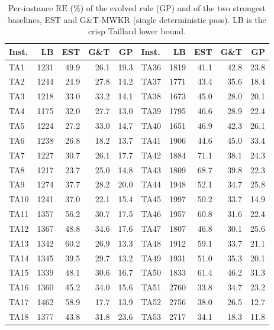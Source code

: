 \documentclass[review,authoryear,11pt]{elsarticle}
\newcommand{\RE}{\mathrm{RE}}
\begin{document}
\begin{table}[t]
\centering\scriptsize
\caption{Per-instance $\RE$ (\%) of the evolved rule (GP) and of the two
strongest baselines, EST and G\&T-MWKR (single deterministic pass). LB is
the crisp Taillard lower bound.}
\label{tab:perinstance}
\renewcommand{\arraystretch}{0.92}
\setlength{\tabcolsep}{4pt}
\begin{tabular}{lrrrr@{\hskip 0.9em}|@{\hskip 0.9em}lrrrr}
\toprule
Inst. & LB & EST & G\&T & GP & Inst. & LB & EST & G\&T & GP \\
\midrule
TA1 & 1231 & 49.9 & 26.1 & 19.3 & TA36 & 1819 & 41.1 & 42.8 & 23.8 \\
TA2 & 1244 & 24.9 & 27.8 & 14.2 & TA37 & 1771 & 43.4 & 35.6 & 18.4 \\
TA3 & 1218 & 33.0 & 33.2 & 14.1 & TA38 & 1673 & 45.0 & 28.0 & 20.1 \\
TA4 & 1175 & 32.0 & 27.7 & 13.0 & TA39 & 1795 & 46.6 & 28.9 & 22.4 \\
TA5 & 1224 & 27.2 & 33.0 & 14.7 & TA40 & 1651 & 46.9 & 42.3 & 26.1 \\
TA6 & 1238 & 26.8 & 18.2 & 13.7 & TA41 & 1906 & 44.6 & 45.0 & 33.4 \\
TA7 & 1227 & 30.7 & 26.1 & 17.7 & TA42 & 1884 & 71.1 & 38.1 & 24.3 \\
TA8 & 1217 & 23.7 & 25.0 & 14.8 & TA43 & 1809 & 68.7 & 39.8 & 22.3 \\
TA9 & 1274 & 37.7 & 28.2 & 20.0 & TA44 & 1948 & 52.1 & 34.7 & 25.8 \\
TA10 & 1241 & 37.0 & 22.1 & 15.4 & TA45 & 1997 & 50.2 & 33.7 & 14.9 \\
TA11 & 1357 & 56.2 & 30.7 & 17.5 & TA46 & 1957 & 60.8 & 31.6 & 22.4 \\
TA12 & 1367 & 48.8 & 34.6 & 17.6 & TA47 & 1807 & 46.8 & 30.1 & 25.6 \\
TA13 & 1342 & 60.2 & 26.9 & 13.3 & TA48 & 1912 & 59.1 & 33.7 & 21.1 \\
TA14 & 1345 & 39.5 & 29.7 & 13.2 & TA49 & 1931 & 51.0 & 35.3 & 20.1 \\
TA15 & 1339 & 48.1 & 30.6 & 16.7 & TA50 & 1833 & 61.4 & 46.2 & 31.3 \\
TA16 & 1360 & 45.2 & 34.0 & 15.6 & TA51 & 2760 & 33.8 & 34.7 & 23.2 \\
TA17 & 1462 & 58.9 & 17.7 & 13.9 & TA52 & 2756 & 38.0 & 26.5 & 12.7 \\
TA18 & 1377 & 43.8 & 31.8 & 23.6 & TA53 & 2717 & 34.1 & 18.3 & 11.8 \\

\end{tabular}
\end{table}
\end{document}
